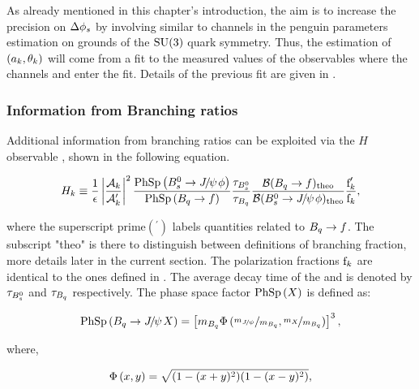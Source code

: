 As already mentioned in this chapter's introduction, the aim is to increase the precision on $\Delta{\ensuremath{\phi_{s}}}$
by involving similar to \BsJpsiPhi channels in the penguin parameters estimation on grounds of the $\mathrm{SU}(3)$ quark symmetry.
Thus, the estimation of $(a_k,\theta_k)$ will come from a \chisq fit to the measured values of the observables
 where the channels \BsJpsiKst and \BdJpsiRho enter the fit.
Details of the previous fit are given in .

\subsubsection{Information from Branching ratios}
Additional information from branching ratios can be exploited via the $H$ observable \cite{Fleischer:1999zi}, shown in
the following equation.

\begin{equation}
\centering
  \Hobs{k} \equiv   \frac{1}{\epsilon}
            \modulo{\frac{\formFctr{k}}{\formFctr{k}'}}^2
                    \frac{\PhSp{\BsJpsiPhi}} {\PhSp{\Bq\to f}}
                    \frac{\tau_{\Bs}}{\tau_{\Bq}}
                    \frac{\BRof{\Bq\to f}_{\rm theo}}{\BRof{\BsJpsiPhi}_{\rm theo}}
                    \frac{\fP{k}'}{{\fP{k}}},
\label{hobs_def}
\end{equation}

\noindent where the superscript prime$({}^\prime)$ labels quantities related to $B_q\rightarrow f$. The subscript "theo" is there
to distinguish between definitions of branching fraction, more details later in the current section.
The polarization fractions $\text{f}_{k}$ are identical to the ones defined in .
The average decay time of the \Bs and \Bq is denoted by $\tau_{B^0_s}$ and $\tau_{B_q}$ respectively.
The phase space factor ${\rm PhSp}\left( X \right)$ is defined as:

\begin{equation}
\centering
   \PhSp{\BJpsiX}  = \brackets{ \mass{\Bq} \PhSpPhi{ \nicefrac{\mass{\jpsi}}{\mass{\Bq}}, \nicefrac{\mass{X}}{\mass{\Bq}}  } }^3,
\label{phase_space_eq_def}
\end{equation}

\noindent where,

\begin{equation}
\centering
   \PhSpPhi{x,y} = \sqrt{ (1-(x+y)^2)(1-(x-y)^2) },
\label{phase_space_phi_eq_def}
\end{equation}

